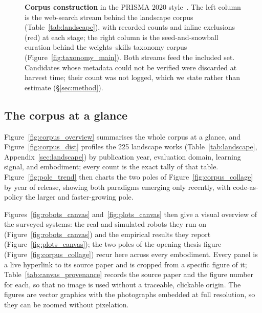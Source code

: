 \documentclass[acmsmall,review,anonymous]{acmart}
\begin{document}
\begin{figure}[t]
{\begin{tikzpicture}
\end{tikzpicture}}
\caption{\textbf{Corpus construction} in the PRISMA 2020 style~\citep{prisma2020}. The left column
is the web-search stream behind the landscape corpus (Table~\ref{tab:landscape}), with recorded
counts and inline exclusions (red) at each stage; the right column is the seed-and-snowball
curation behind the weights--skills taxonomy corpus (Figure~\ref{fig:taxonomy_main}). Both streams feed the
included set. Candidates whose metadata could not be verified were discarded at harvest time; their
count was not logged, which we state rather than estimate (\S\ref{sec:method}).}
\label{fig:prisma}
\end{figure}
 
\subsection{The corpus at a glance}
\label{sec:corpus_gallery}

Figure~\ref{fig:corpus_overview} summarises the whole corpus at a glance, and
Figure~\ref{fig:corpus_dist} profiles the 225 landscape works (Table~\ref{tab:landscape},
Appendix~\ref{sec:landscape}) by publication year, evaluation domain, learning signal, and
embodiment; every count is the exact tally of that table. Figure~\ref{fig:pole_trend} then charts the
two poles of Figure~\ref{fig:corpus_collage} by year of release, showing both paradigms emerging only
recently, with code-as-policy the larger and faster-growing pole.

Figures~\ref{fig:robots_canvas} and~\ref{fig:plots_canvas} then give a visual overview of the surveyed
systems: the real and simulated robots they run on (Figure~\ref{fig:robots_canvas}) and the empirical
results they report (Figure~\ref{fig:plots_canvas}); the two poles of the opening thesis figure
(Figure~\ref{fig:corpus_collage}) recur here across every embodiment. Every panel is a live hyperlink
to its source paper and is cropped from a specific figure of it; Table~\ref{tab:canvas_provenance}
records the source paper and the figure number for each, so that no image is used without a
traceable, clickable origin. The figures are vector graphics with the photographs embedded at full
resolution, so they can be zoomed without pixelation.
\end{document}
